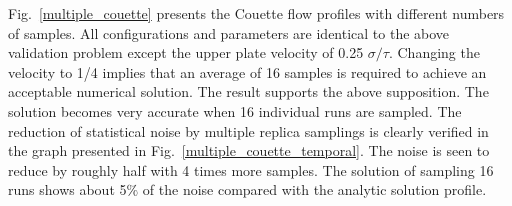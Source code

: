 \documentclass[preprint,12pt]{elsarticle}
\begin{document}

Fig.~\ref{multiple_couette} presents the Couette flow profiles with different numbers of samples. All configurations and parameters are identical to the above validation problem except the upper plate velocity of 0.25 $\sigma/\tau$.  Changing the velocity to 1/4 implies that an average of 16 samples is required to achieve an acceptable numerical solution. The result supports the above supposition. The solution becomes very accurate when 16 individual runs are sampled. The reduction of statistical noise by multiple replica samplings is clearly verified in the graph presented in Fig.~\ref{multiple_couette_temporal}. The noise is seen to reduce by roughly half with 4 times more samples. The solution of sampling 16 runs shows about 5$\%$ of the noise compared with the analytic solution profile.
\end{document}
